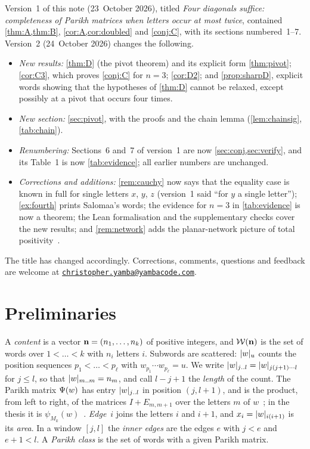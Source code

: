 \documentclass[11pt,a4paper]{article}
\begin{document}
Version~1 of this note (23~October 2026), titled \emph{Four diagonals suffice: completeness of Parikh matrices when letters occur at most twice}, contained \cref{thm:A,thm:B}, \cref{cor:A,cor:doubled} and \cref{conj:C}, with its sections numbered~1--7. Version~2 (24~October 2026) changes the following.
\begin{itemize}
\item \emph{New results:} \cref{thm:D} (the pivot theorem) and its explicit form \cref{thm:pivot}; \cref{cor:C3}, which proves \cref{conj:C} for $n=3$; \cref{cor:D2}; and \cref{prop:sharpD}, explicit words showing that the hypotheses of \cref{thm:D} cannot be relaxed, except possibly at a pivot that occurs four times.
\item \emph{New section:} \cref{sec:pivot}, with the proofs and the chain lemma (\cref{lem:chainsig}, \cref{tab:chain}).
\item \emph{Renumbering:} Sections~6 and~7 of version~1 are now \cref{sec:conj,sec:verify}, and its Table~1 is now \cref{tab:evidence}; all earlier numbers are unchanged.
\item \emph{Corrections and additions:} \cref{rem:cauchy} now says that the equality case is known in full for single letters $x$, $y$, $z$ (version~1 said ``for $y$ a single letter''); \cref{ex:fourth} prints Salomaa's words; the evidence for $n=3$ in \cref{tab:evidence} is now a theorem; the Lean formalisation and the supplementary checks cover the new results; and \cref{rem:network} adds the planar-network picture of total positivity~\cite{FZ00,GV85}.
\end{itemize}
The title has changed accordingly. Corrections, comments, questions and feedback are welcome at \href{mailto:christopher.yamba@yambacode.com}{\texttt{christopher.yamba@yambacode.com}}.

\section{Preliminaries}\label{sec:prelim}

A \emph{content} is a vector $\mathbf{n}=(n_1,\dots,n_k)$ of positive integers, and $\mathcal{W}(\mathbf{n})$ is the set of words over $1<\dots<k$ with $n_i$ letters $i$. Subwords are scattered: $\lvert w\rvert_{u}$ counts the position sequences $p_1<\dots<p_\ell$ with $w_{p_1}\cdots w_{p_\ell}=u$. We write $\lvert w\rvert_{j\mathinner{\ldotp\ldotp} l}=\lvert w\rvert_{j(j+1)\cdots l}$ for $j\le l$, so that $\lvert w\rvert_{m\mathinner{\ldotp\ldotp} m}=n_m$, and call $l-j+1$ the \emph{length} of the count. The Parikh matrix $\Psi(w)$ has entry $\lvert w\rvert_{j\mathinner{\ldotp\ldotp} l}$ in position $(j,l+1)$, and is the product, from left to right, of the matrices $I+E_{m,m+1}$ over the letters $m$ of $w$~\cite[Definition~1.1, Theorem~2.1]{MSSY01}; in the thesis it is $\psi_{M_k}(w)$~\cite[Definition~2.8, Theorem~2.10, ]{Yamba06}. \emph{Edge}~$i$ joins the letters $i$ and $i+1$, and $x_i=\lvert w\rvert_{i(i+1)}$ is its \emph{area}. In a window $[j,l]$ the \emph{inner edges} are the edges $e$ with $j<e$ and $e+1<l$. A \emph{Parikh class} is the set of words with a given Parikh matrix.
\end{document}
